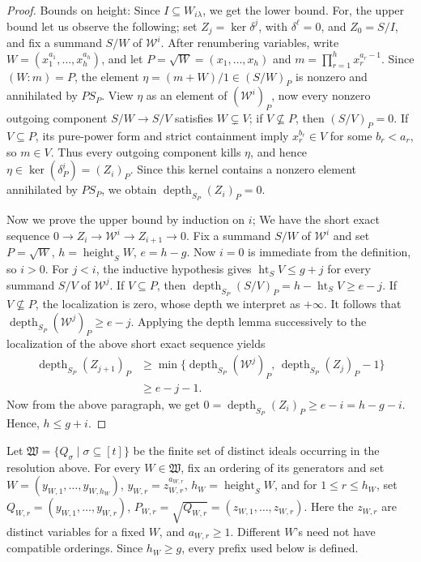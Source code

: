 \documentclass[11pt,letterpaper]{amsart}
\newcommand{\seq}{\subseteq}
\newcommand{\x}{\xrightarrow{}}
\newcommand{\sW}{\mathfrak W}
\DeclareMathOperator{\dep}{depth}
\DeclareMathOperator{\height}{height}
\theoremstyle{plain}
\theoremstyle{definition}
\theoremstyle{remark}
\begin{document}
\begin{proof}
Bounds on height: Since $I\seq W_{i\lambda}$, we get the lower bound. For, the upper bound let us observe the following; set $Z_j=\ker\delta^j$, with $\delta^\ell=0$, and $Z_0=S/I$, and fix a summand $S/W$ of $\mathcal W^i$.
After renumbering variables, write $W=(x_1^{a_1},\ldots,x_h^{a_h})$, and let $P=\sqrt{W}=(x_1,\ldots,x_h)$ and $m=\prod_{r=1}^h x_r^{a_r-1}$.
Since $(W:m)=P$, the element $\eta=(m+W)/1\in(S/W)_P$ is nonzero and annihilated by $PS_P$.
View $\eta$ as an element of $(\mathcal W^i)_P$, now every nonzero outgoing component $S/W\to S/V$ satisfies $W\subsetneq V$; if $V\nsubseteq P$, then $(S/V)_P=0$.
If $V\subseteq P$, its pure-power form and strict containment imply $x_r^{b_r}\in V$ for some $b_r<a_r$, so $m\in V$.
Thus every outgoing component kills $\eta$, and hence $\eta\in\ker(\delta^i_P)=(Z_i)_P$.
Since this kernel contains a nonzero element annihilated by $PS_P$, we obtain $\operatorname{depth}_{S_P}(Z_i)_P=0$.

Now we prove the upper bound by induction on $i$; We have the short exact sequence $0\x Z_i\x \mathcal{W}^i\x Z_{i+1}\x 0$. Fix a summand $S/W$ of $\mathcal W^i$ and set $P=\sqrt W$, $h=\height_S W$, $e=h-g$. Now $i=0$ is immediate from the definition, so $i>0$. For $j<i$, the inductive hypothesis gives
$\operatorname{ht}_S V\leq g+j$ for every summand $S/V$
of $\mathcal W^j$.
If $V\subseteq P$, then $\dep_{S_P}(S/V)_P
=h-\operatorname{ht}_S V\geq e-j$. If $V\nsubseteq P$, the localization is zero, whose depth
we interpret as $+\infty$.
It follows that
$\operatorname{depth}_{S_P}(\mathcal W^j)_P\geq e-j$. Applying the depth lemma successively to the localization
of the above short exact sequence yields
\[
\begin{aligned}
\operatorname{depth}_{S_P}(Z_{j+1})_P
&\geq
\min\bigl\{
\operatorname{depth}_{S_P}(\mathcal W^j)_P,\,
\operatorname{depth}_{S_P}(Z_j)_P-1
\bigr\}\\
&\geq e-j-1.
\end{aligned}
\]
Now from the above paragraph, we get $0=\dep_{S_P}(Z_i)_P\ge e-i=h-g-i$. Hence, $h\le g+i$.
\end{proof}

Let \(\sW=\{Q_\sigma\mid \sigma\seq [t]\}\) be the finite set of distinct ideals occurring in the resolution above. For every \(W\in\sW\), fix an ordering
of its generators and set $
 W=(y_{W,1},\ldots,y_{W,h_W})$, $
 y_{W,r}=z_{W,r}^{a_{W,r}}$, $h_W=\height_S W$, and for $1\le r\le h_W$, set $Q_{W,r}=(y_{W,1},\ldots,y_{W,r})$,  $P_{W,r}=\sqrt{Q_{W,r}}=(z_{W,1},\ldots,z_{W,r})$. Here the \(z_{W,r}\) are distinct variables for a fixed \(W\), and
\(a_{W,r}\geq1\). Different \(W\)'s need not have compatible orderings.
Since \(h_W\geq g\), every prefix used below is defined. 
\end{document}

